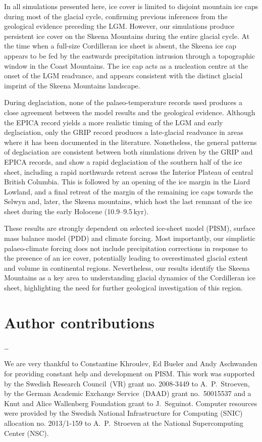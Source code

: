 \documentclass[tc, manuscript]{copernicus}
\begin{document}
In all simulations presented here, ice cover is limited to disjoint mountain ice
caps during most of the glacial cycle, confirming previous inferences from the
geological evidence preceding the LGM. However, our
simulations produce persistent ice cover on the Skeena Mountains during
the entire glacial cycle. At the time when a full-size Cordilleran ice sheet is
absent, the Skeena ice cap appears to be fed by the eastwards precipitation
intrusion through a topographic window in the Coast Mountains. The ice cap acts
as a nucleation centre at the onset of the LGM readvance, and appears
consistent with the distinct glacial imprint of the Skeena Mountains landscape.

During deglaciation, none of the palaeo-temperature records used produces a
close agreement between the model results and the geological evidence. Although
the EPICA record yields a more realistic timing of the LGM and early
deglaciation, only the GRIP record produces a late-glacial readvance in areas
where it has been documented in the literature. Nonetheless, the
general patterns of deglaciation are consistent between both simulations driven
by the GRIP and EPICA records, and show a rapid deglaciation of the southern
half of the ice sheet, including a rapid northwards retreat across the Interior
Plateau of central British Columbia. This is followed by an opening of the ice
margin in the Liard Lowland, and a final retreat of the margin of the remaining
ice caps towards the Selwyn and, later, the Skeena mountains, which host the
last remnant of the ice sheet
during the early Holocene (10.9--9.5\,kyr).

These results are strongly dependent on selected ice-sheet model (PISM),
surface
mass balance model (PDD) and climate forcing. Most importantly, our simplistic
palaeo-climate forcing does not include precipitation corrections in response
to the presence of an ice cover, potentially leading to overestimated glacial
extent and volume in continental regions. Nevertheless, our results identify
the Skeena Mountains as a key area to understanding
glacial dynamics of the Cordilleran ice sheet, highlighting the need for
further geological investigation of this region.

\section*{Author contributions}
\dots

\begin{acknowledgements}
We are very thankful to Constantine Khroulev, Ed Bueler and Andy Aschwanden for
providing constant help and development on PISM. This work was supported by the
Swedish Research Council~(VR) grant no. 2008-3449 to A.~P.~Stroeven, by the
German Academic Exchange Service~(DAAD) grant no.~50015537 and a Knut and Alice
Wallenberg Foundation grant to J.~Seguinot.
Computer resources were provided by the Swedish National
Infrastructure for Computing (SNIC) allocation no. 2013/1-159 to A.~P.~Stroeven
at the National Supercomputing Center (NSC).
\end{acknowledgements}
\end{document}

